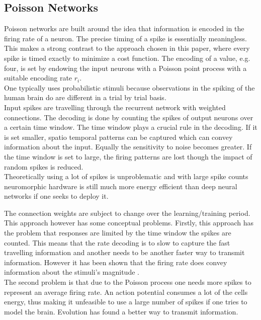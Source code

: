 \subsection{Poisson Networks}
Poisson networks are built around the idea that information is encoded in the firing rate of a neuron. The precise timing of a spike is essentially meaningless\cite{brette_philosophy_2015}. This makes a strong contrast to the approach chosen in this paper, where every spike is timed exactly to minimize a cost function.
The encoding of a value, e.g. four, is set by endowing the input neurons with a Poisson point process with a suitable encoding rate $r_i$\cite{deneve_efficient_2016}.\\
One typically uses probabilistic stimuli because observations in the spiking of the human brain do are different in a trial by trial basis.\\
Input spikes are travelling through the recurrent network with weighted connections. The decoding is done by counting the spikes of output neurons over a certain time window. The time window plays a crucial rule in the decoding. If it is set smaller, spatio temporal patterns can be captured which can convey information about the input. Equally the sensitivity to noise becomes greater. If the time window is set to large, the firing patterns are lost though the impact of random spikes is reduced.\\
Theoretically using a lot of spikes is unproblematic and with large spike counts neuromorphic hardware is still much more energy efficient than deep neural networks if one seeks to deploy it. 

The connection weights are subject to change over the learning/training period\cite{almomani_comparative_2019}.\\
This approach however has some conceptual problems. Firstly, this approach has the problem that responses are limited by the time window the spikes are counted\cite{andrew_spiking_2003}. This means that the rate decoding is to slow to capture the fast travelling information and another needs to be another faster way to transmit information. However it has been shown that the firing rate does convey information about the stimuli's magnitude \cite{adrian_impulses_1926}.\\
The second problem is that due to the Poisson process one needs more spikes to represent an average firing rate. An action potential consumes a lot of the cells energy\cite{attwell_energy_2001}, thus making it unfeasible to use a large number of spikes if one tries to model the brain. Evolution has found a better way to transmit information.


